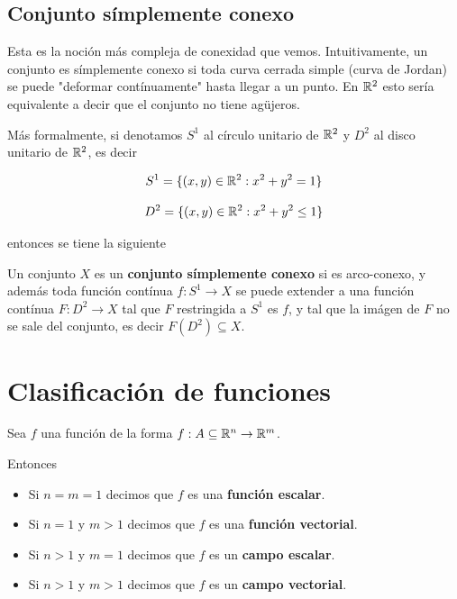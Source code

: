 \subsection{Conjunto símplemente conexo}

Esta es la noción más compleja de conexidad que vemos.  Intuitivamente, un conjunto es símplemente conexo si toda curva cerrada simple (curva de Jordan) se puede "deformar contínuamente" hasta llegar a un punto.  En $ \mathbb{R}^2$ esto sería equivalente a decir que el conjunto no tiene agüjeros.  

Más formalmente, si denotamos $S^1$ al círculo unitario de $\mathbb{R}^2$ y $D^2$ al disco unitario de $\mathbb{R}^2$, es decir

$$ S^1 = \{(x,y) \in \mathbb{R}^2 : x^2 + y^2 = 1 \} $$

$$ D^2 = \{(x,y) \in \mathbb{R}^2 : x^2 + y^2 \leq 1 \} $$

entonces se tiene la siguiente

\begin{definition}
Un conjunto $X$ es un \textbf{conjunto símplemente conexo}  si es arco-conexo, y además toda función contínua $f : S^1 \to X$ se puede extender a una función contínua $F : D^2 \to X$ tal que $F$ restringida a $S^1$ es $f$, y tal que la imágen de $F$ no se sale del conjunto, es decir $F(D^2) \subseteq X$.
\end{definition}

\section{Clasificación de funciones}

\begin{definition}
Sea $f$ una función de la forma $ f : A \subseteq \mathbb{R}^n \to \mathbb{R}^m$.  

Entonces

\begin{itemize}
\item Si $n=m=1$ decimos que $f$ es una \textbf{función escalar}. 

\item Si $n=1$ y $m>1$ decimos que $f$ es una \textbf{función vectorial}. 

\item Si $n>1$ y $m=1$ decimos que $f$ es un \textbf{campo escalar}. 

\item Si $n>1$ y $m>1$ decimos que $f$ es un \textbf{campo vectorial}. 
\end{itemize}

\end{definition}

